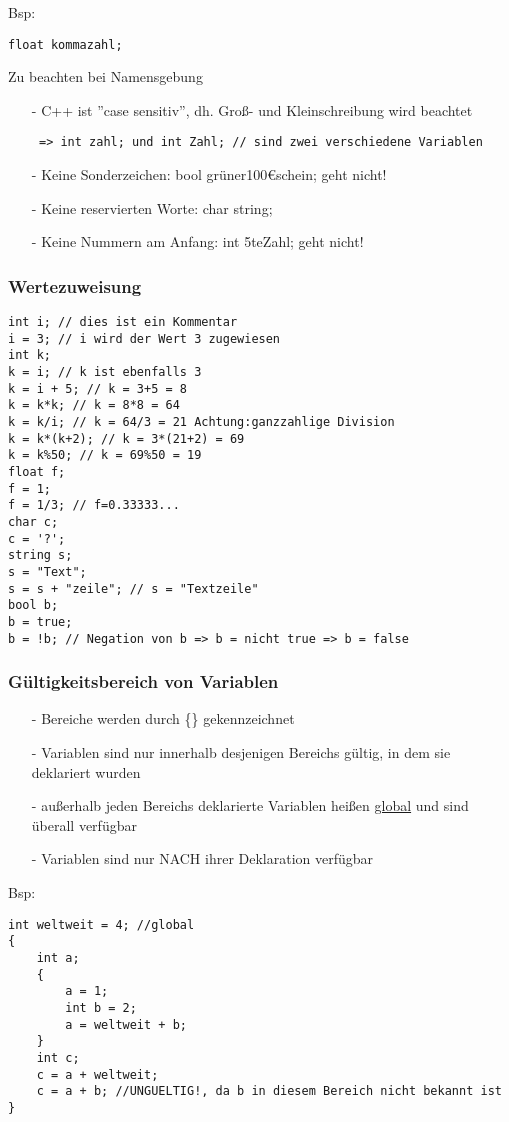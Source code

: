Bsp: 
\begin{lstlisting}
float kommazahl;
\end{lstlisting}
Zu beachten bei Namensgebung
\begin{itemize}
\item[-] C++ ist ''case sensitiv'', dh. Groß- und Kleinschreibung wird beachtet
 \begin{lstlisting}
 => int zahl; und int Zahl; // sind zwei verschiedene Variablen
 \end{lstlisting}
 \item[-] Keine Sonderzeichen: bool grüner100\euro{}schein; geht nicht!
 \item[-] Keine reservierten Worte: char string;
 \item[-] Keine Nummern am Anfang: int 5teZahl; geht nicht!
\end{itemize}

\subsubsection{Wertezuweisung}
\begin{lstlisting}
int i; // dies ist ein Kommentar
i = 3; // i wird der Wert 3 zugewiesen
int k;
k = i; // k ist ebenfalls 3
k = i + 5; // k = 3+5 = 8
k = k*k; // k = 8*8 = 64
k = k/i; // k = 64/3 = 21 Achtung:ganzzahlige Division
k = k*(k+2); // k = 3*(21+2) = 69
k = k%50; // k = 69%50 = 19
float f;
f = 1;
f = 1/3; // f=0.33333...
char c;
c = '?';
string s;
s = "Text";
s = s + "zeile"; // s = "Textzeile"
bool b;
b = true;
b = !b; // Negation von b => b = nicht true => b = false
\end{lstlisting}
\subsubsection{Gültigkeitsbereich von Variablen}
\begin{itemize}
\item[-] Bereiche werden durch \{\} gekennzeichnet
\item[-] Variablen sind nur innerhalb desjenigen Bereichs gültig, in dem sie deklariert wurden
\item[-] außerhalb jeden Bereichs deklarierte Variablen heißen \underline{global} und sind überall verfügbar
\item[-] Variablen sind nur NACH ihrer Deklaration verfügbar
\end{itemize}
Bsp:
\begin{lstlisting}
int weltweit = 4; //global
{
	int a;
	{
		a = 1;
		int b = 2;
		a = weltweit + b;
	}
	int c;
	c = a + weltweit;
	c = a + b; //UNGUELTIG!, da b in diesem Bereich nicht bekannt ist
}
\end{lstlisting}
